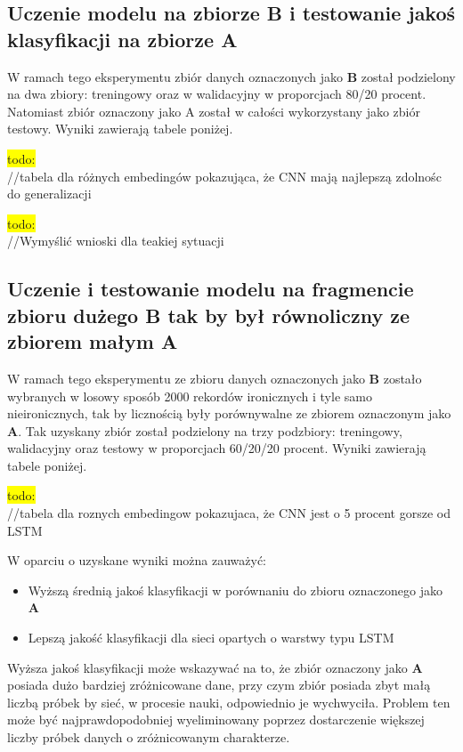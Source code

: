 \subsection{Uczenie modelu na zbiorze B i testowanie jakoś klasyfikacji na zbiorze A }

W ramach tego eksperymentu zbiór danych oznaczonych jako \textbf{B} został podzielony na dwa zbiory: treningowy oraz w walidacyjny w proporcjach 80/20 procent. Natomiast zbiór oznaczony jako A został w całości wykorzystany jako zbiór testowy. Wyniki zawierają tabele poniżej.

\colorbox{yellow}{todo:}\\
//tabela dla różnych embedingów pokazująca, że CNN mają najlepszą zdolnośc do generalizacji

\colorbox{yellow}{todo:}\\
//Wymyślić wnioski dla teakiej sytuacji


\subsection{Uczenie i testowanie modelu na fragmencie zbioru dużego B tak by był równoliczny ze zbiorem małym A}

W ramach tego eksperymentu ze zbioru danych oznaczonych jako \textbf{B} zostało wybranych w losowy sposób 2000 rekordów ironicznych i tyle samo nieironicznych, tak by licznością były porównywalne ze zbiorem oznaczonym jako \textbf{A}. Tak uzyskany zbiór został podzielony na trzy podzbiory: treningowy, walidacyjny oraz testowy w proporcjach 60/20/20 procent. Wyniki zawierają tabele poniżej.

\colorbox{yellow}{todo:}\\
//tabela dla roznych embedingow pokazujaca, że CNN jest o 5 procent gorsze od LSTM

W oparciu o uzyskane wyniki można zauważyć:

\begin{itemize}
    \item Wyższą średnią jakoś klasyfikacji w porównaniu do zbioru oznaczonego jako \textbf{A}
    \item Lepszą jakość klasyfikacji dla sieci opartych o warstwy typu LSTM
\end{itemize}


Wyższa jakoś klasyfikacji może wskazywać na to, że zbiór oznaczony jako \textbf{A} posiada dużo bardziej zróżnicowane dane, przy czym zbiór posiada zbyt małą liczbą próbek by sieć, w procesie nauki, odpowiednio je wychwyciła. Problem ten może być najprawdopodobniej wyeliminowany poprzez dostarczenie większej liczby próbek danych o zróżnicowanym charakterze.

